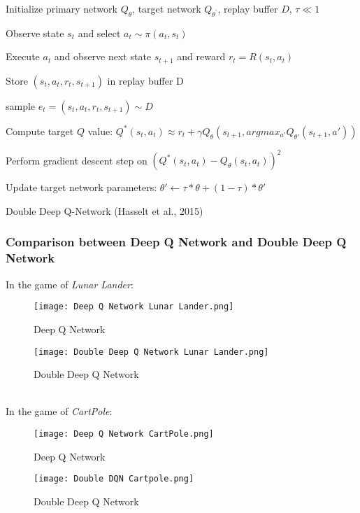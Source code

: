 \documentclass{article}
\begin{document}
\begin{algorithm} 
    Initialize primary network $Q_{\theta}$, target network $Q_{\theta^{\prime}}$, replay buffer $D$, $\tau \ll 1$
    
    {
        { 
            Observe state $s_t$ and select $a_t \sim \pi \left(a_t, s_t\right)$
            
            Execute $a_t$ and observe next state $s_{t+1}$ and reward $r_t = R\left(s_t, a_t\right)$
            
            Store $\left(s_t, a_t, r_t, s_{t+1}\right)$ in replay buffer D
        }
        {
            sample $e_{t} = \left(s_t, a_t, r_t, s_{t+1}\right) \sim D$
            
            Compute target $Q$ value:
                $Q^*\left(s_t, a_t\right) \approx r_t + \gamma{Q_\theta\left(s_{t+1}, argmax_{a'}Q_{\theta'}\left( s_{t+1}, a'\right) \right)}$
            
            Perform gradient descent step on $\left(Q^*\left(s_t, a_t \right) - Q_\theta\left(s_t, a_t \right) \right)^2$
            
            Update target network parameters: 
                $\theta' \leftarrow \tau \ast \theta + \left(1 - \tau \right) \ast \theta'$
        }
    }
    \caption{Double Deep Q-Network (Hasselt et al., 2015) }
\end{algorithm}

\newpage 

\subsubsection*{Comparison between Deep Q Network and Double Deep Q Network}
In the game of \textit{Lunar Lander}:
\begin{figure}[h!]
  \centering
  \begin{minipage}[b]{0.4\textwidth}
    \texttt{[image: Deep Q Network Lunar Lander.png]}
    \caption{Deep Q Network}
  \end{minipage}
  \hfill
  \begin{minipage}[b]{0.4\textwidth}
    \texttt{[image: Double Deep Q Network Lunar Lander.png]}
    \caption{Double Deep Q Network}
  \end{minipage}
\end{figure}
\\
In the game of \textit{CartPole}:
\begin{figure}[h!]
  \centering
  \begin{minipage}[b]{0.4\textwidth}
    \texttt{[image: Deep Q Network CartPole.png]}
    \caption{Deep Q Network}
  \end{minipage}
  \hfill
  \begin{minipage}[b]{0.4\textwidth}
    \texttt{[image: Double DQN Cartpole.png]}
    \caption{Double Deep Q Network}
  \end{minipage}
\end{figure}
\end{document}
